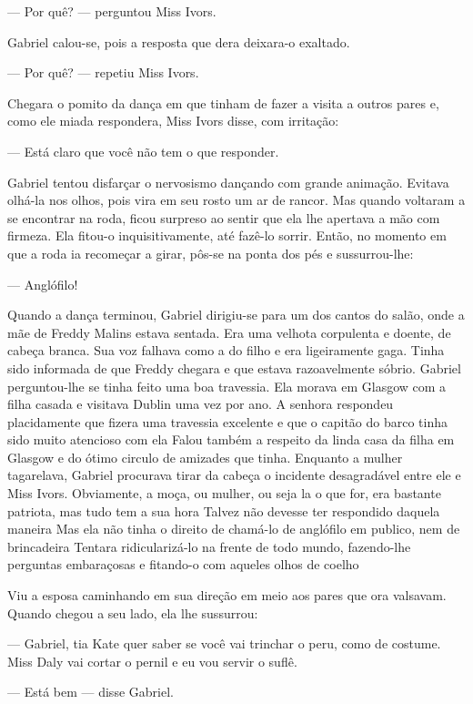 --- Por quê? --- perguntou Miss Ivors.

Gabriel calou-se, pois a resposta que dera deixara-o exaltado.

--- Por quê? --- repetiu Miss Ivors.

Chegara o pomito da dança em que tinham de fazer a visita a outros
pares e, como ele miada respondera, Miss Ivors disse, com irritação:

--- Está claro que você não tem o que responder.

Gabriel tentou disfarçar o nervosismo dançando com grande animação.
Evitava olhá-la nos olhos, pois vira em seu rosto um ar de rancor. Mas
quando voltaram a se encontrar na roda, ficou surpreso ao sentir que
ela lhe apertava a mão com firmeza. Ela fitou-o inquisitivamente,
até fazê-lo sorrir. Então, no momento em que a roda ia recomeçar a
girar, pôs-se na ponta dos pés e sussurrou-lhe:

--- Anglófilo!

Quando a dança terminou, Gabriel dirigiu-se para um dos cantos do
salão, onde a mãe de Freddy Malins estava sentada. Era uma velhota
corpulenta e doente, de cabeça branca. Sua voz falhava como a do filho
e era ligeiramente gaga. Tinha sido informada de que Freddy chegara e
que estava razoavelmente sóbrio. Gabriel perguntou-lhe se tinha feito
uma boa travessia. Ela morava em Glasgow com a filha casada e visitava
Dublin uma vez por ano. A senhora respondeu placidamente que fizera
uma travessia excelente e que o capitão do barco tinha sido muito
atencioso com ela Falou também a respeito da linda casa da filha em
Glasgow e do ótimo circulo de amizades que tinha. Enquanto a mulher
tagarelava, Gabriel procurava tirar da cabeça o incidente desagradável
entre ele e Miss Ivors. Obviamente, a moça, ou mulher, ou seja la o
que for, era bastante patriota, mas tudo tem a sua hora Talvez não
devesse ter respondido daquela maneira Mas ela não tinha o direito de
chamá-lo de anglófilo em publico, nem de brincadeira Tentara
ridicularizá-lo na frente de todo mundo, fazendo-lhe perguntas
embaraçosas e fitando-o com aqueles olhos de coelho

Viu a esposa caminhando em sua direção em meio aos pares que ora
valsavam. Quando chegou a seu lado, ela lhe sussurrou:

--- Gabriel, tia Kate quer saber se você vai trinchar o peru, como de
costume. Miss Daly vai cortar o pernil e eu vou servir o suflê.

--- Está bem --- disse Gabriel.

